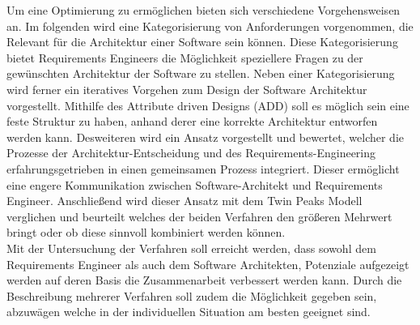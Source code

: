 Um eine Optimierung zu ermöglichen bieten sich verschiedene Vorgehensweisen an. Im folgenden wird eine Kategorisierung von Anforderungen vorgenommen, die Relevant für die Architektur einer Software sein können. Diese Kategorisierung bietet Requirements Engineers die Möglichkeit speziellere Fragen zu der gewünschten Architektur der Software zu stellen. Neben einer Kategorisierung wird ferner ein iteratives Vorgehen zum Design der Software Architektur vorgestellt. Mithilfe des Attribute driven Designs (ADD) soll es möglich sein eine feste Struktur zu haben, anhand derer eine korrekte Architektur entworfen werden kann. Desweiteren wird ein Ansatz vorgestellt und bewertet, welcher die Prozesse der Architektur-Entscheidung und des Requirements-Engineering erfahrungsgetrieben in einen gemeinsamen Prozess integriert. Dieser ermöglicht eine engere Kommunikation zwischen Software-Architekt und Requirements Engineer. Anschließend wird dieser Ansatz mit dem Twin Peaks Modell verglichen und beurteilt welches der beiden Verfahren den größeren Mehrwert bringt oder ob diese sinnvoll kombiniert werden können.\\

Mit der Untersuchung der Verfahren soll erreicht werden, dass sowohl dem Requirements Engineer als auch dem Software Architekten, Potenziale aufgezeigt werden auf deren Basis die Zusammenarbeit verbessert werden kann. Durch die Beschreibung mehrerer Verfahren soll zudem die Möglichkeit gegeben sein, abzuwägen welche in der individuellen Situation am besten geeignet sind. 